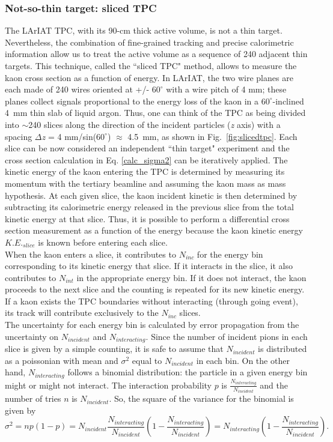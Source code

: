 \subsubsection{Not-so-thin target: sliced TPC}
\label{sec:thick}
The LArIAT TPC, with its 90-cm thick active volume, is not a thin target. Nevertheless, the combination of fine-grained tracking and precise calorimetric information allow us to treat the active volume as a sequence of 240 adjacent thin targets. This technique, called the ``sliced TPC" method, allows to measure the kaon cross section as a function of energy.  In LArIAT, the two wire planes are each made of 240 wires oriented at +/- $60^{\circ}$ with a wire pitch of 4 mm; these planes collect signals proportional to the energy loss of the kaon in a $60^{\circ}$-inclined 4~mm thin slab of liquid argon. Thus, one can think of the TPC as being divided into $\sim$240 slices along the direction of the incident particles ({\textit
{z}} axis) with a spacing $\Delta${\textit
{z}} = 4 mm/sin($60^{\circ}$) $\approx$ 4.5~mm, as shown in Fig.~\ref{fig:slicedtpc}. 
Each slice can be now considered an independent ``thin target" experiment and the cross section calculation in Eq. \ref{calc_sigma2} can be iteratively applied. The kinetic energy of the kaon entering the TPC is determined by measuring its momentum with the tertiary beamline and assuming the kaon mass as mass hypothesis. At each given slice, the kaon incident kinetic  is then determined by subtracting its calorimetric energy released in the previous slice from the total kinetic energy at that slice. Thus, it is possible to perform a differential cross section measurement as a function of the energy because the kaon kinetic energy $K.E._{slice}$  is known before entering each slice. \\ 
When the kaon enters a slice, it contributes to $N_{inc}$ for the energy bin corresponding to  its kinetic energy  that slice. If it interacts in the slice, it also contributes to $N_{int}$ in the appropriate energy bin. If it does not interact, the kaon proceeds to the next slice and the counting is repeated for its new kinetic energy. If a kaon exists the TPC boundaries without interacting (through going event), its track will contribute exclusively to the $N_{inc}$ slices.\\

The uncertainty for each energy bin is calculated by error propagation from the uncertainty on $N_{incident}$ and $N_{interacting}$. 
Since the number of incident pions in each slice is given by a simple counting, it is safe to assume that $N_{incident}$ is distributed as a poissonian with mean and $\sigma^2$ equal to $N_{incident}$ in each bin.  
On the other hand, $N_{interacting}$ follows a binomial distribution: the particle in a given energy bin might or might not interact.  The interaction probability $p$ is $\frac{ N_{interacting}}{N_{incident}}$ and the number of tries $n$ is $N_{incident}$. 
So, the square of the variance for the binomial is given by  $$\sigma^2 = np(1-p) =  N_{incident}\frac{ N_{interacting}}{N_{incident}} (1-\frac{ N_{interacting}}{N_{incident}}) = N_{interacting}(1-\frac{ N_{interacting}}{N_{incident}}).$$

